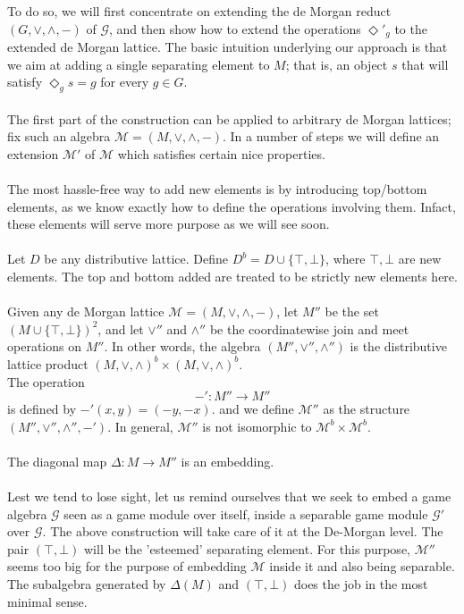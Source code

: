 \documentclass[12pt]{article}
\begin{document}
To do so, we will first concentrate on extending the de Morgan reduct $(G, \vee, \wedge, -)$ of $\mathcal{G}$, 
and then show how to extend the operations $\Diamond'_g$ to the extended de Morgan lattice. The basic intuition underlying our approach is that we aim at adding a single separating element to $M$; that is, 
an object $s$ that will satisfy $\Diamond_g s = g$ for every $g \in G$. \\ \\
The first part of the construction can be applied to arbitrary de Morgan lattices; fix such an algebra $\mathcal{M} = (M, \vee, \wedge, -)$. 
In a number of steps we will define an extension $\mathcal{M}'$ of $\mathcal{M}$ which satisfies certain nice properties.\\ \\
The most hassle-free way to add new elements is by introducing top/bottom elements, as we know exactly how to define the operations involving them. Infact, these elements will serve more purpose as we will see soon. \\ \\
Let $D$ be any distributive lattice. Define $D^b = D \cup \{\top, \bot\}$, where $\top, \bot$ are new elements. The top and bottom added are treated to be strictly new elements here. \\ \\
Given any de Morgan lattice $\mathcal{M} = (M, \vee, \wedge, -)$,  
let $M''$ be the set $(M \cup \{\top, \bot\})^2$, and let $\vee''$ and $\wedge''$ be the coordinatewise join and meet operations on $M''$.  
In other words, the algebra $(M'', \vee'', \wedge'')$ is the distributive lattice product $(M, \vee, \wedge)^{b} \times (M, \vee, \wedge)^{b}$. \\
The operation \[-' : M'' \to M''\] is defined by $-'(x,y) = (-y, -x)$. 
and we define $\mathcal{M}''$ as the structure $(M'', \vee'', \wedge'', -')$.  
In general, $\mathcal{M}''$ is not isomorphic to $\mathcal{M}^{b} \times \mathcal{M}^{b}$. \\ \\
The diagonal map $\Delta : M \longrightarrow M''$ is an embedding. \\ \\
Lest we tend to lose sight, let us remind ourselves that we seek to embed a game algebra $\mathcal{G}$ seen as a game module over itself, inside a separable game module $\mathcal{G}'$ over $\mathcal{G}$. The above construction will take care of it at the De-Morgan level. The pair $(\top,\bot)$ will be the 'esteemed' separating element. For this purpose, $\mathcal{M}''$ seems too big for the purpose of embedding $\mathcal{M}$ inside it and also being separable. The subalgebra generated by $\Delta(M)$ and $(\top,\bot)$ does the job in the most minimal sense. \\   
\end{document}
